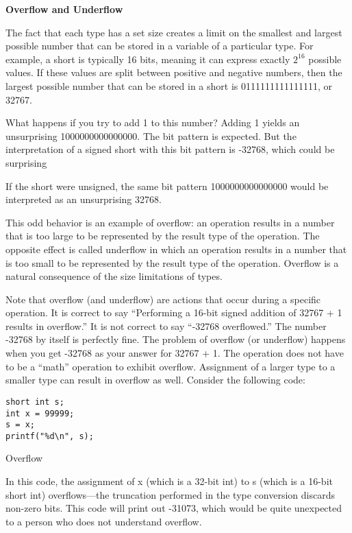 \documentclass[11pt, a4paper]{article}
\begin{document}
\textbf{Overflow and Underflow}


The fact that each type has a set size creates a limit on the smallest and largest possible number that can be stored in a variable of a particular type. For example, a short is typically 16 bits, meaning it can express exactly $2^{16}$ possible values. If these values are split between positive and negative numbers, then the largest possible number that can be stored in a short is 0111111111111111, or 32767.

What happens if you try to add 1 to this number? Adding 1 yields an unsurprising 1000000000000000. The bit pattern is expected. But the interpretation of a signed short with this bit pattern is -32768, which could be surprising




 If the short were unsigned, the same bit pattern 1000000000000000 would be interpreted as an unsurprising 32768.

This odd behavior is an example of overflow: an operation results in a number that is too large to be represented by the result type of the operation. The opposite effect is called underflow in which an operation results in a number that is too small to be represented by the result type of the operation. Overflow is a natural consequence of the size limitations of types.

Note that overflow (and underflow) are actions that occur during a specific operation. It is correct to say “Performing a 16-bit signed addition of 32767 + 1 results in overflow.” It is not correct to say “-32768 overflowed.” The number -32768 by itself is perfectly fine. The problem of overflow (or underflow) happens when you get -32768 as your answer for 32767 + 1. The operation does not have to be a “math” operation to exhibit overflow. Assignment of a larger type to a smaller type can result in overflow as well. Consider the following code:



\begin{listing}
\begin{verbatim}
short int s;
int x = 99999;
s = x;
printf("%d\n", s);
\end{verbatim}
\caption{Overflow}
\label{lst:overflow}
\end{listing}



In this code, the assignment of x (which is a 32-bit int) to s (which is a 16-bit short int) overflows—the truncation performed in the type conversion discards non-zero bits. This code will print out -31073, which would be quite unexpected to a person who does not understand overflow.
\end{document}
